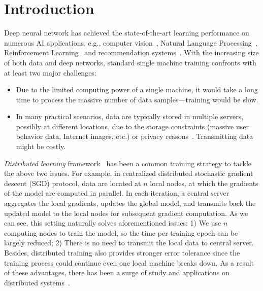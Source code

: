 \documentclass[11pt]{article}
\begin{document}
\section{Introduction}\label{sec:introduction}

Deep neural network has achieved the state-of-the-art learning performance on numerous AI applications, e.g., computer vision~\cite{Proc:GAN_NIPS14,Proc:Resnet_CVPR16,CV_review18}, Natural Language Processing~\cite{Proc:Graves_ICASSP13,NLP_review18,sentiment_review18}, Reinforcement Learning~\cite{Arxiv:MnihKSGAWR13,AlphaGo_17} and recommendation systems~\cite{Proc:Covington_2016,Article:Wei_2017}. With the increasing size of both data and deep networks, standard single machine training confronts with at least two major challenges:
\begin{itemize}
    \item Due to the limited computing power of a single machine, it would take a long time to process the massive number of data samples---training would be slow.
  
    \item In many practical scenarios, data are typically stored in multiple servers, possibly at different locations, due to the storage constraints (massive user behavior data, Internet images, etc.) or privacy reasons~\cite{Proc:Chang18}. Transmitting data might be costly.
\end{itemize}
\textit{Distributed learning} framework~\cite{Proc:Dean_NIPS12} has been a common training strategy to tackle the above two issues. For example, in centralized distributed stochastic gradient descent (SGD) protocol, data are located at $n$ local nodes, at which the gradients of the model are computed in parallel. In each iteration, a central server aggregates the local gradients, updates the global model, and transmits back the updated model to the local nodes for subsequent gradient computation. As we can see, this setting naturally solves aforementioned issues: 1) We use $n$ computing nodes to train the model, so the time per training epoch can be largely reduced; 2) There is no need to transmit the local data to central server. Besides, distributed training also provides stronger error tolerance since the training process could continue even one local machine breaks down. As a result of these advantages, there has been a surge of study and applications on distributed systems~\cite{boyd2011distributed,nedic2009distributed,duchi2011dual,Arxiv:Goyal17,hong2017prox,lu2019gnsd,koloskova2019decentralized}.
\end{document}
